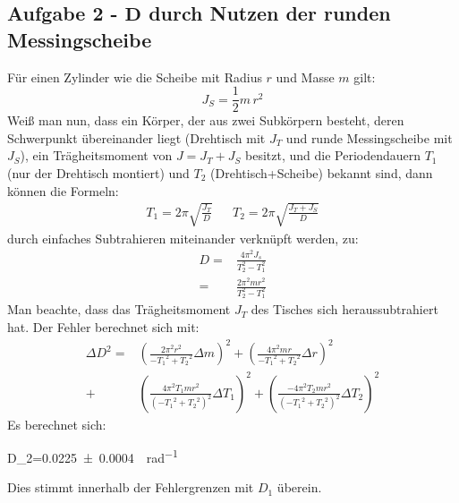 \clearpage

\subsection[\texorpdfstring{Aufgabe 2 - \(D\) durch Nutzen der runden Messingscheibe}{Aufgabe 2 - D durch Nutzen der runden Messingscheibe}]{Aufgabe 2 - \(\boldsymbol{D}\) durch Nutzen der runden Messingscheibe}
Für einen Zylinder wie die Scheibe mit Radius \(r\) und Masse \(m\) gilt:
\begin{equation}
  J_S=\frac{1}{2}m\,r^2
\end{equation}
Weiß man nun, dass ein Körper, der aus zwei Subkörpern besteht, deren Schwerpunkt übereinander liegt (Drehtisch mit \(J_T\) und runde Messingscheibe mit \(J_S\)), ein Trägheitsmoment von \(J=J_T+J_S\) besitzt, und die Periodendauern \(T_1\) (nur der Drehtisch montiert) und \(T_2\) (Drehtisch+Scheibe) bekannt sind, dann können die Formeln:
\begin{align}
  T_1=2\pi\sqrt{\frac{J_T}{D}}&&
  T_2=2\pi\sqrt{\frac{J_T+J_S}{D}}
\end{align}
durch einfaches Subtrahieren miteinander verknüpft werden, zu:
\begin{align}
  D=&\frac{4 \pi^{2} J_{s}}{T_{2}^{2} - T_{1}^{2}}
  \label{J_Platte}\\
  =& \frac{2 \pi^{2} m r^{2}}{T_{2}^{2} - T_{1}^{2}}
  \label{D_T}
\end{align} 
Man beachte, dass das Trägheitsmoment \(J_T\) des Tisches sich heraussubtrahiert hat. Der Fehler berechnet sich mit:
\begin{equation}
  \begin{aligned}
 \Delta D^2=&\left(\frac{2{\pi}^2 r^2}{-{T_1}^2+{T_2}^2} \Delta m\right)^2+\left(\frac{4{\pi}^2 m r}{-{T_1}^2+{T_2}^2} \Delta r\right)^2\\
 +&\left(\frac{4{\pi}^2 T_1 m r^2}{\left(-{T_1}^2+{T_2}^2\right)^2} \Delta T_1\right)^2+\left(\frac{-4{\pi}^2 T_2 m r^2}{\left(-{T_1}^2+{T_2}^2\right)^2} \Delta T_2\right)^2
  \end{aligned}
\end{equation}
Es berechnet sich:
\begin{rb}
D_2=\qty{0.0225(4)}{\Nm\per\radian}
\end{rb}
Dies stimmt innerhalb der Fehlergrenzen mit \(D_1\) überein.
\newpage


